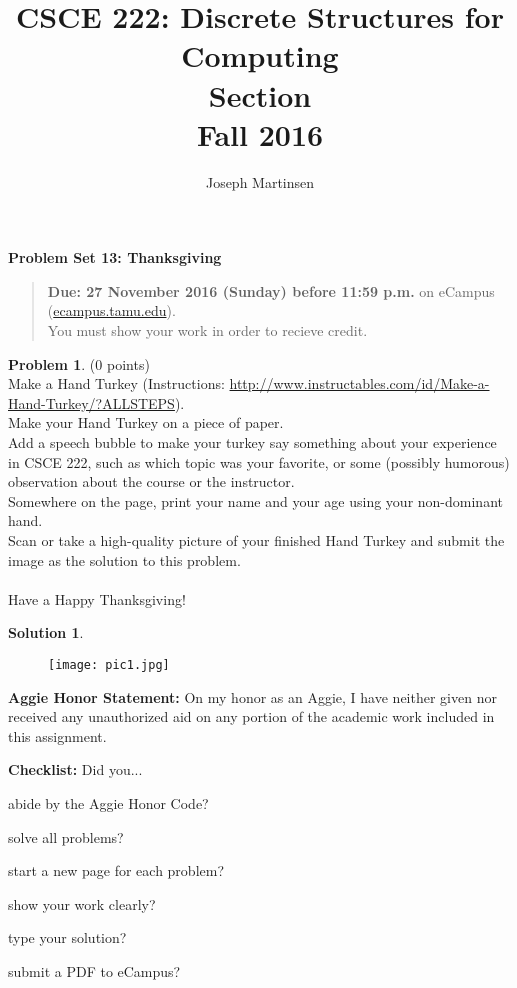 \documentclass{article}
\title{CSCE 222: Discrete Structures for Computing\\Section \mysectionnumber\\Fall 2016}
\author{Joseph Martinsen}
\theoremstyle{definition}
\newtheorem{problem}{Problem}
\newtheorem*{solution}{Solution}
\newcommand{\honor}{\noindent \textbf{Aggie Honor Statement: }On my honor as an Aggie, I have neither
  given nor received any unauthorized aid on any portion of the academic work included in this assignment.
}
\newcommand{\checklist}{\noindent\textbf{Checklist:}
Did you...
\begin{compactenum}
\item abide by the Aggie Honor Code?
\item solve all problems?
\item start a new page for each problem?
\item show your work clearly?
\item type your solution?
\item submit a PDF to eCampus?
\end{compactenum}
}
\newcommand{\problemset}[1]{\begin{center}\textbf{Problem Set #1}\end{center}}
\newcommand{\duedate}[1]{\begin{quote}\textbf{Due: #1} on eCampus (\url{ecampus.tamu.edu}). \\You must show your work in order to recieve credit.\end{quote}}
\begin{document}
\maketitle

\problemset{13: Thanksgiving}

\duedate{27 November 2016 (Sunday) before 11:59 p.m.}

\bigskip

\begin{problem} (0 points)\\
Make a Hand Turkey (Instructions: \url{http://www.instructables.com/id/Make-a-Hand-Turkey/?ALLSTEPS}).\\
Make your Hand Turkey on a piece of paper.\\
Add a speech bubble to make your turkey say something about your experience in CSCE 222, such as which topic was your favorite, or some (possibly humorous) observation about the course or the instructor.\\
Somewhere on the page, print your name and your age using your non-dominant hand.\\
Scan or take a high-quality picture of your finished Hand Turkey and submit the image as the solution to this problem.\\
\\
Have a Happy Thanksgiving!
\end{problem}

\begin{solution}\ \\
\newpage
\begin{figure}[h]
  \begin{center}
    \texttt{[image: pic1.jpg]}
  \end{center}
\end{figure}
\end{solution}

\newpage


\bigskip
\honor

\bigskip
\checklist
\end{document}
